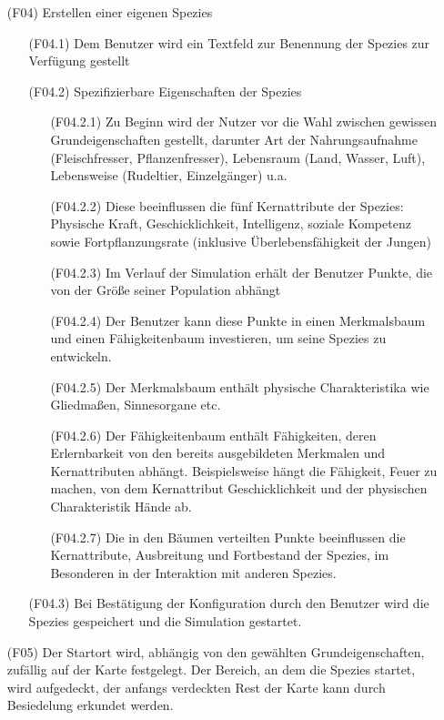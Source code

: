 \documentclass[a4paper, 10pt]{article}
\begin{document}
\begin{enumerate}
\item[(F04)]
Erstellen einer eigenen Spezies
\begin{enumerate}
\item[(F04.1)]
Dem Benutzer wird ein Textfeld zur Benennung der Spezies zur Verfügung gestellt
\item[(F04.2)] Spezifizierbare Eigenschaften der Spezies
\begin{enumerate}
\item[(F04.2.1)]
Zu Beginn wird der Nutzer vor die Wahl zwischen gewissen Grundeigenschaften gestellt, darunter Art der Nahrungsaufnahme (Fleischfresser, Pflanzenfresser), Lebensraum (Land, Wasser, Luft), Lebensweise (Rudeltier, Einzelgänger) u.a.
\item[(F04.2.2)]
Diese beeinflussen die fünf Kernattribute der Spezies: Physische Kraft, Geschicklichkeit, Intelligenz, soziale Kompetenz sowie Fortpflanzungsrate (inklusive Überlebensfähigkeit der Jungen)
\item[(F04.2.3)]
Im Verlauf der Simulation erhält der Benutzer Punkte, die von der Größe seiner Population abhängt
\item[(F04.2.4)]
Der Benutzer kann diese Punkte in einen Merkmalsbaum und einen Fähigkeitenbaum investieren, um seine Spezies zu entwickeln.
\item[(F04.2.5)]
Der Merkmalsbaum enthält physische Charakteristika wie Gliedmaßen, Sinnesorgane etc.
\item[(F04.2.6)]
Der Fähigkeitenbaum enthält Fähigkeiten, deren Erlernbarkeit von den bereits ausgebildeten Merkmalen und Kernattributen abhängt. Beispielsweise hängt die Fähigkeit, Feuer zu machen, von dem Kernattribut Geschicklichkeit und der physischen Charakteristik Hände ab.
\item[(F04.2.7)]
Die in den Bäumen verteilten Punkte beeinflussen die Kernattribute, Ausbreitung und Fortbestand der Spezies, im Besonderen in der Interaktion mit anderen Spezies.
\end{enumerate}

\item[(F04.3)]
Bei Bestätigung der Konfiguration durch den Benutzer wird die Spezies gespeichert und die Simulation gestartet.
\end{enumerate}

\item[(F05)]
Der Startort wird, abhängig von den gewählten Grundeigenschaften, zufällig auf der Karte festgelegt. Der Bereich, an dem die Spezies startet, wird aufgedeckt, der anfangs verdeckten Rest der Karte kann durch Besiedelung erkundet werden.



\end{enumerate}
\end{document}
